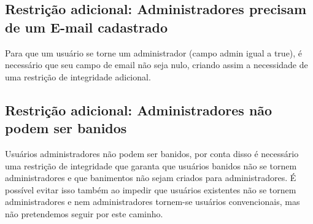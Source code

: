 \subsection{Restrição adicional: Administradores precisam de um E-mail cadastrado}

Para que um usuário se torne um administrador (campo admin igual a true), é
necessário que seu campo de email não seja nulo, criando assim a necessidade de
uma restrição de integridade adicional.

\subsection{Restrição adicional: Administradores não podem ser banidos}

Usuários administradores não podem ser banidos, por conta disso é necessário
uma restrição de integridade que garanta que usuários banidos não se tornem
administradores e que banimentos não sejam criados para administradores. É
possível evitar isso também ao impedir que usuários existentes não se tornem
administradores e nem administradores tornem-se usuários convencionais, mas não
pretendemos seguir por este caminho.
